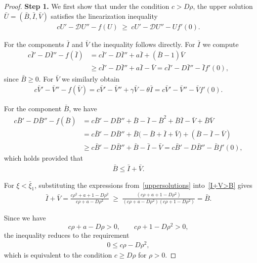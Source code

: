 \documentclass[11pt]{article}
\theoremstyle{definition}
\begin{document}
\begin{proof} 
\textbf{Step 1.} We first show that under the condition $c > D\rho$, the upper solution 
$\bar{U} = (\bar{B}, \bar{I}, \bar{V})$ satisfies the linearization inequality
\begin{align}\label{linearization_inequality}
    cU' - \mathcal{D}U'' - f(U) \;\ge\; cU' - \mathcal{D}U'' - Uf'(0).
\end{align}

For the components $\bar{I}$ and $\bar{V}$ the inequality follows directly.  
For $\bar{I}$ we compute
\begin{align}
    c\bar{I}' - D\bar{I}'' - f(\bar{I})
    &= c\bar{I}' - D\bar{I}'' + a\bar{I} + (\bar{B}-1)\bar{V} \\
    &\ge c\bar{I}' - D\bar{I}'' + a\bar{I} - \bar{V}
      = c\bar{I}' - D\bar{I}'' - \bar{I}f'(0),
\end{align}
since $\bar{B} \ge 0$.  
For $\bar{V}$ we similarly obtain
\begin{align}
    c\bar{V}' - \bar{V}'' - f(\bar{V})
    = c\bar{V}' - \bar{V}'' + \gamma \bar{V} - \theta \bar{I}
    = c\bar{V}' - \bar{V}'' - \bar{V}f'(0).
\end{align}

For the component $\bar{B}$, we have
\begin{align}
    c\bar{B}' - D\bar{B}'' - f(\bar{B})
    &= c\bar{B}' - D\bar{B}'' 
    + \bar{B} - \bar{I} - \bar{B}^2 + \bar{B}\bar{I} - \bar{V} + \bar{B}\bar{V} \\
    &= c\bar{B}' - D\bar{B}'' 
       + \bar{B}\bigl(-\bar{B} + \bar{I} + \bar{V}\bigr)
       + (\bar{B}-\bar{I} - \bar{V}) \\
    &\ge c\bar{B}' - D\bar{B}'' + \bar{B} - \bar{I} - \bar{V}
      = c\bar{B}' - D\bar{B}'' - \bar{B}f'(0),
\end{align}
which holds provided that
\begin{align} \label{I+V>B}
    \bar{B} \le \bar{I} + \bar{V}.
\end{align}

For $\xi < \bar{\xi}_1$, substituting the expressions from~\eqref{uppersolutions} into~\eqref{I+V>B} gives
\begin{align}
    \bar{I} + \bar{V}
    = \frac{c\rho^{2}+a+1 - D\rho^2}{c\rho+a - D\rho^2}
    \;\ge\;
    \frac{(c\rho+a+1 - D\rho^2)}
         {(c\rho+a - D\rho^2)(c\rho+1 - D\rho^2)}=\bar{B}.
\end{align}

Since we have
\[
c\rho+a - D\rho > 0,
\qquad
c\rho+1 - D\rho^2 > 0,
\]
the inequality reduces to the requirement
\begin{align}\label{upper_requirement}
    0 \le c\rho - D\rho^{2},
\end{align}
which is equivalent to the condition $c \ge D\rho$ for $\rho>0$.


\end{proof}
\end{document}

